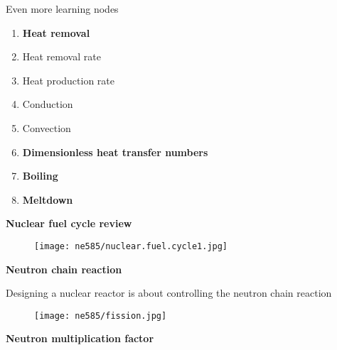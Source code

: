 \documentclass[aspectratio=1610,pdftex,dvipsnames,compress,xcolor={dvipsnames}]{beamer}
\begin{document}
\begin{frame}{Even more learning nodes}
    \begin{enumerate}[series=outerlist,topsep=0pt,itemsep=1pt,leftmargin=*,label=(\arabic*)]
                \item[]\textbf{Heat removal}
                \item[]Heat removal rate
                \item[]Heat production rate
                \item[]Conduction
                \item[]Convection
                    \vspace{0.15in}
                \item[]\textbf{Dimensionless heat transfer numbers}
                    \vspace{0.15in}
                \item[]\textbf{Boiling}
                    \vspace{0.15in}
                \item[]\textbf{Meltdown}
    \end{enumerate}
\end{frame}


\begin{frame}[plain]{}
    \centering\LARGE\textbf{Nuclear fuel cycle review}
\end{frame}


\addtocounter{framenumber}{-1} 
\begin{frame}{}
    \begin{figure}
        \centering
        \texttt{[image: ne585/nuclear.fuel.cycle1.jpg]}
    \end{figure}
\end{frame}


\begin{frame}[plain]{}
    \centering\LARGE\textbf{Neutron chain reaction}
\end{frame}


\addtocounter{framenumber}{-1} 
\begin{frame}{Designing a nuclear reactor is about controlling the neutron chain reaction}
    \begin{figure}
        \centering
        \texttt{[image: ne585/fission.jpg]}
    \end{figure}
\end{frame}


\begin{frame}[plain]{}
    \centering\LARGE\textbf{Neutron multiplication factor}
\end{frame}
\end{document}
